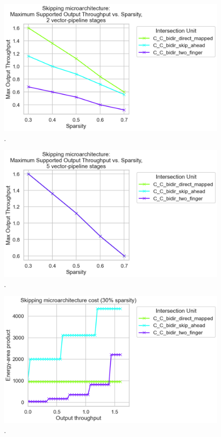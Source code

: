 \begin{figure}[H]
\includegraphics[width=\textwidth]{figures/skip_uarch_pipe_2.png}
\caption{.}
\label{fig:skip_uarch_pipe_2}
\end{figure}

\begin{figure}[H]
\includegraphics[width=\textwidth]{figures/skip_uarch_pipe_5.png}
\caption{.}
\label{fig:skip_uarch_pipe_5}
\end{figure}

\begin{figure}[H]
\includegraphics[width=\textwidth]{figures/skip_uarch_sparsity_30pct.png}
\caption{.}
\label{fig:skip_uarch_sparsity_30pct}
\end{figure}

